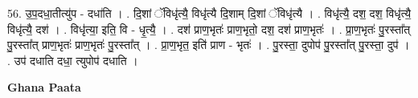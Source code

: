 \documentclass[17pt]{extarticle}
\begin{document}
56. उ॒प॒दधा॒तीत्यु॑प - दधा॑ति । . दि॒शां ॅविधृ॑त्यै॒ विधृ॑त्यै दि॒शाम् दि॒शां ॅविधृ॑त्यै । . विधृ॑त्यै॒ दश॒ दश॒ विधृ॑त्यै॒ विधृ॑त्यै॒ दश॑ । . विधृ॑त्या॒ इति॒ वि - धृ॒त्यै॒ । . दश॑ प्राण॒भृतः॑ प्राण॒भृतो॒ दश॒ दश॑ प्राण॒भृतः॑ । . प्रा॒ण॒भृतः॑ पु॒रस्ता᳚त् पु॒रस्ता᳚त् प्राण॒भृतः॑ प्राण॒भृतः॑ पु॒रस्ता᳚त् । . प्रा॒ण॒भृत॒ इति॑ प्राण - भृतः॑ । . पु॒रस्ता॒ दुपोप॑ पु॒रस्ता᳚त् पु॒रस्ता॒ दुप॑ । . उप॑ दधाति दधा॒ त्युपोप॑ दधाति । \newline

\textbf{Ghana Paata } \newline
\end{document}
